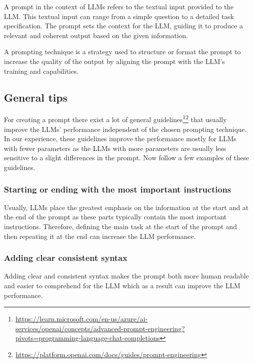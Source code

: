 A prompt in the context of LLMs refers to the textual input provided to the LLM. This textual input can range from a simple question to a detailed task specification. The prompt sets the context for the LLM, guiding it to produce a relevant and coherent output based on the given information.

A prompting technique is a strategy used to structure or format the prompt to increase the quality of the output by aligning the prompt with the LLM's training and capabilities.


\subsection{General tips}
\label{prompt_general_tips}

For creating a prompt there exist a lot of general guidelines\footnote{\url{https://learn.microsoft.com/en-us/azure/ai-services/openai/concepts/advanced-prompt-engineering?pivots=programming-language-chat-completions}}\footnote{\url{https://platform.openai.com/docs/guides/prompt-engineering}} that usually improve the LLMs' performance independent of the chosen prompting technique. In our experience, these guidelines improve the performance mostly for LLMs with fewer parameters as the LLMs with more parameters are usually less sensitive to a slight differences in the prompt. Now follow a few examples of these guidelines.


\subsubsection{Starting or ending with the most important instructions}

Usually, LLMs place the greatest emphasis on the information at the start and at the end of the prompt as these parts typically contain the most important instructions. Therefore, defining the main task at the start of the prompt and then repeating it at the end can increase the LLM performance.


\subsubsection{Adding clear consistent syntax}

Adding clear and consistent syntax makes the prompt both more human readable and easier to comprehend for the LLM which as a result can improve the LLM performance.



